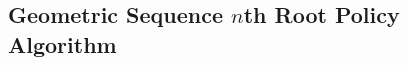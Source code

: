 \subsection{Geometric Sequence $n$th Root Policy Algorithm}
\label{sec:geom-seq-nth-root-algo}







